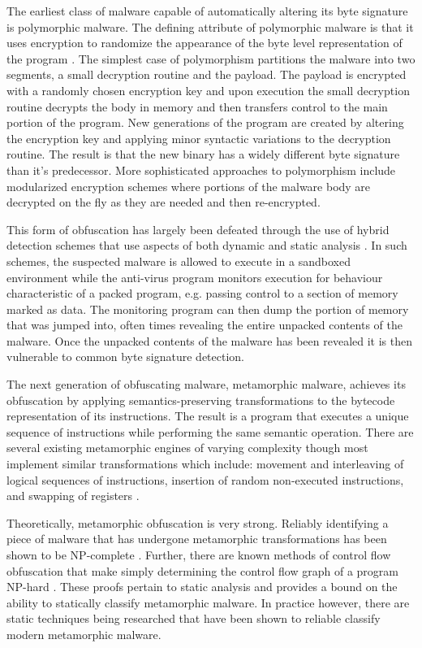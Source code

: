     The earliest class of malware capable of automatically altering its byte
    signature is polymorphic malware. The defining attribute of polymorphic
    malware is that it uses encryption to randomize the appearance of the byte
    level representation of the program \cite{simile}. The simplest case of
    polymorphism partitions the malware into two segments, a small decryption
    routine and the payload. The payload is encrypted with a randomly chosen
    encryption key and upon execution the small decryption routine decrypts the
    body in memory and then transfers control to the main portion of the
    program. New generations of the program are created by altering the
    encryption key and applying minor syntactic variations to the decryption
    routine. The result is that the new binary has a widely different byte
    signature than it's predecessor. More sophisticated approaches to
    polymorphism include modularized encryption schemes where portions of the
    malware body are decrypted on the fly as they are needed and then
    re-encrypted.

    This form of obfuscation has largely been defeated through the use of hybrid
    detection schemes that use aspects of both dynamic and static analysis
    \cite{polyunpack}. In such schemes, the suspected malware is allowed to
    execute in a sandboxed environment while the anti-virus program monitors
    execution for behaviour characteristic of a packed program, e.g. passing
    control to a section of memory marked as data. The monitoring program can
    then dump the portion of memory that was jumped into, often times revealing
    the entire unpacked contents of the malware. Once the unpacked contents of
    the malware has been revealed it is then vulnerable to common byte signature
    detection.

    The next generation of obfuscating malware, metamorphic malware, achieves
    its obfuscation by applying semantics-preserving transformations to the
    bytecode representation of its instructions. The result is a program that
    executes a unique sequence of instructions while performing the same
    semantic operation. There are several existing metamorphic engines of
    varying complexity though most implement similar transformations which
    include: movement and interleaving of logical sequences of instructions,
    insertion of random non-executed instructions, and swapping of registers
    \cite{simile}. 

    Theoretically, metamorphic obfuscation is very strong. Reliably identifying
    a piece of malware that has undergone metamorphic transformations has been
    shown to be NP-complete \cite{npcomplete}. Further, there are known methods
    of control flow obfuscation that make simply determining the control flow
    graph of a program NP-hard \cite{controlflow}. These proofs pertain to
    static analysis and provides a bound on the ability to statically classify
    metamorphic malware. In practice however, there are static techniques being
    researched that have been shown to reliable classify modern metamorphic
    malware.

